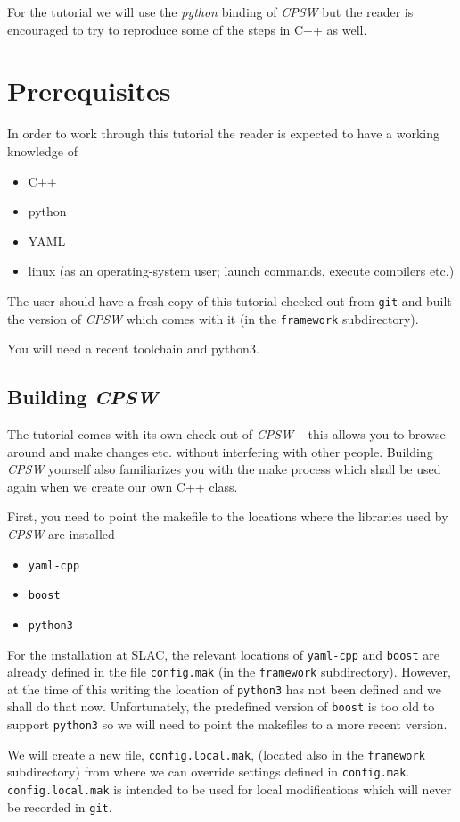 \documentclass[10pt]{article}
\newcommand{\ita}[1]{\emph{#1}}
\newcommand{\cpsw}      {\ita {CPSW}}
\newcommand{\git}       {{\tt{}git}}
\newcommand{\py}        {python}
\newcommand{\pyt}       {python3}
\newcommand{\cpp}       {C++}
\newcommand{\cod}[1] {{\tt#1}}
\begin{document}
For the tutorial we will use the {\em \py} binding of \cpsw{} but the reader
is encouraged to try to reproduce some of the steps in \cpp{} as well.

\section{Prerequisites}
In order to work through this tutorial the reader is expected to have a working
knowledge of
\begin{itemize}
  \item \cpp{}
  \item \py
  \item YAML
  \item linux (as an operating-system user; launch commands, execute compilers etc.)
\end{itemize}

The user should have a fresh copy of this tutorial checked out from \git{} and built
the version of \cpsw{} which comes with it (in the \cod{framework} subdirectory).

You will need a recent toolchain and \pyt{}.

\subsection{Building \cpsw}
The tutorial comes with its own check-out of \cpsw{} -- this allows you to browse 
around and make changes etc. without interfering with other people. Building \cpsw{}
yourself also familiarizes you with the make process which shall be used again
when we create our own \cpp{} class.

First, you need to point the makefile to the locations where the libraries used by
\cpsw{} are installed
\begin{itemize}
\item \cod{yaml-cpp}
\item \cod{boost}
\item \cod{\py3}
\end{itemize}
For the installation at SLAC, the relevant locations of \cod{yaml-cpp} and \cod{boost}
are already defined in the file \cod{config.mak} (in the \cod{framework} subdirectory).
However, at the time of this writing the location of \cod{\py3} has not been defined
and we shall do that now. Unfortunately, the predefined version of \cod{boost} is too old
to support \cod{\py3} so we will need to point the makefiles to a more recent version.

We will create a new file, \cod{config.local.mak}, (located also in the \cod{framework}
subdirectory) from where we can override settings defined in \cod{config.mak}.
\cod{config.local.mak} is intended to be used for local modifications which will
never be recorded in \cod{git}.
\end{document}
